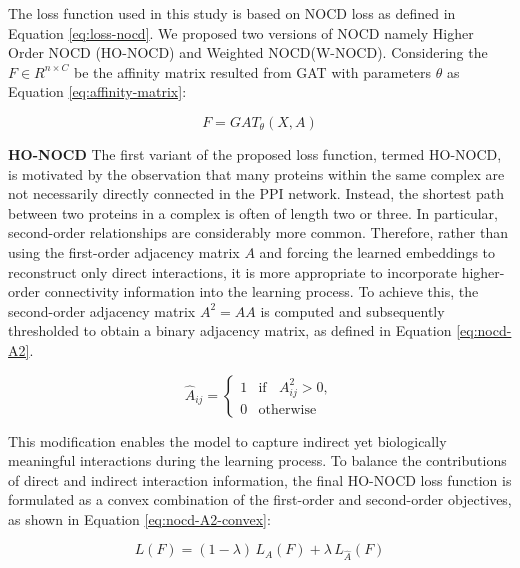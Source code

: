 The loss function used in this study is based on NOCD loss as defined in Equation \ref{eq:loss-nocd}. We proposed two versions of NOCD namely Higher Order NOCD (HO-NOCD) and Weighted NOCD(W-NOCD). Considering the $F \in R^{n \times C}$ be the affinity matrix resulted from GAT with parameters $\theta$ as Equation \ref{eq:affinity-matrix}:

\begin{equation}
	F = GAT_{\theta}(X,A)
	\label{eq:affinity-matrix}
\end{equation} 



\textbf{HO-NOCD} The first variant of the proposed loss function, termed HO-NOCD, is motivated by the observation that many proteins within the same complex are not necessarily directly connected in the PPI network. 
Instead, the shortest path between two proteins in a complex is often of length two or three. 
In particular, second-order relationships are considerably more common. Therefore, rather than using the first-order adjacency matrix \(A\) and forcing the learned embeddings to reconstruct only direct interactions, it is more appropriate to incorporate higher-order connectivity information into the learning process. To achieve this, the second-order adjacency matrix \(A^2 = AA\) is computed and subsequently thresholded to obtain a binary adjacency matrix, as defined in Equation \ref{eq:nocd-A2}.

\begin{equation}
	\hat{A}_{ij} =
	\begin{cases}
		1 & \text{if } \; \; A^2_{ij} > 0, \\
		0 & \text{otherwise}
	\end{cases}
	\label{eq:nocd-A2}
\end{equation} 

This modification enables the model to capture indirect yet biologically meaningful interactions during the learning process. To balance the contributions of direct and indirect interaction information, the final HO-NOCD loss function is formulated as a convex combination of the first-order and second-order objectives, as shown in Equation \ref{eq:nocd-A2-convex}:

\begin{equation}
	L(F) = (1-\lambda)\, L_{A}(F) + \lambda\, L_{\hat{A}}(F)
	\label{eq:nocd-A2-convex}
\end{equation}

